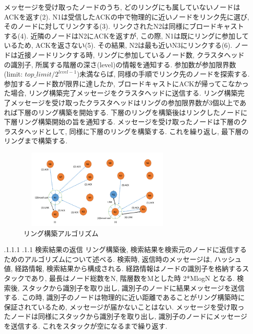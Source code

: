 \documentclass[a4paper, twocolumn]{jarticle}
\makeatletter
\def\section{\@startsection{section}{1}{\z@}%
 {.1\Cvs \@plus.1\Cdp \@minus.1\Cdp}%
 {.1\Cvs \@plus.1\Cdp}%
 {\normalfont\normalsize\bfseries}}
\makeatother
\begin{document}
メッセージを受け取ったノードのうち, どのリングにも属していないノードはACKを返す(2).
N1は受信したACKの中で物理的に近いノードをリンク先に選び, そのノードに対してリンクする(3).
リンクされたN2は同様にブロードキャストする(4).
近隣のノードはN2にACKを返すが, この際, N1は既にリングに参加しているため, ACKを返さない(5).
その結果, N2は最も近いN3にリンクする(6).
ノードは近接ノードリンクする時, リングに参加しているノード数, クラスタヘッドの識別子, 所属する階層の深さ(level)の情報を通知する.
参加数が参加限界数(limit: \begin{math} top\_limit / 2^{level-1} \end{math})未満ならば, 同様の手順でリンク先のノードを探索する.
参加するノード数が限界に達したか, ブロードキャストにACKが帰ってこなかった場合, リング構築完了メッセージをクラスタヘッドに送信する.
リング構築完了メッセージを受け取ったクラスタヘッドはリングの参加限界数が3個以上であれば下層のリング構築を開始する.
下層のリングを構築後はリンクしたノードに下層リング構築開始の旨を通知する. 
メッセージを受け取ったノードは下層のクラスタヘッドとして, 同様に下層のリングを構築する.
これを繰り返し, 最下層のリングまで構築する.
\begin{figure}[htbp]
	\begin{center}
	\includegraphics[width=8cm, height=4cm]{DAAS_CSN_5.png}
	\end{center}
	\caption{リング構築アルゴリズム}\label{fig:ring_struct_algorithm}
\end{figure}

\section{検索結果の返信}
リング構築後, 検索結果を検索元のノードに返信するためのアルゴリズムについて述べる.
検索時, 返信時のメッセージは, ハッシュ値, 経路情報, 検索結果から構成される.
経路情報はノードの識別子を格納するスタックであり, 最長はノード総数をN, 階層数をMとした時 2*MlogN となる.
検索後, スタックから識別子を取り出し, 識別子のノードに結果メッセージを送信する.
この時, 識別子のノードは物理的に近い距離であることがリング構築時に保証されているため, メッセージが届かないことはない.
メッセージを受け取ったノードは同様にスタックから識別子を取り出し, 識別子のノードにメッセージを送信する.
これをスタックが空になるまで繰り返す. 
\end{document}
